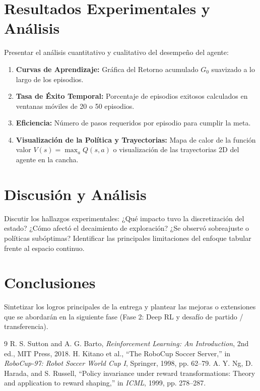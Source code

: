 \documentclass[11pt,a4paper]{article}
\begin{document}
\section{Resultados Experimentales y Análisis}
Presentar el análisis cuantitativo y cualitativo del desempeño del agente:

\begin{enumerate}
    \item \textbf{Curvas de Aprendizaje:} Gráfica del Retorno acumulado $G_0$ suavizado a lo largo de los episodios.
    \item \textbf{Tasa de Éxito Temporal:} Porcentaje de episodios exitosos calculados en ventanas móviles de 20 o 50 episodios.
    \item \textbf{Eficiencia:} Número de pasos requeridos por episodio para cumplir la meta.
    \item \textbf{Visualización de la Política y Trayectorias:} Mapa de calor de la función valor $V(s) = \max_a Q(s, a)$ o visualización de las trayectorias 2D del agente en la cancha.
\end{enumerate}


\section{Discusión y Análisis }
Discutir los hallazgos experimentales: ¿Qué impacto tuvo la discretización del estado? ¿Cómo afectó el decaimiento de exploración? ¿Se observó sobreajuste o políticas subóptimas? Identificar las principales limitaciones del enfoque tabular frente al espacio continuo.

\section{Conclusiones}
Sintetizar los logros principales de la entrega y plantear las mejoras o extensiones que se abordarán en la siguiente fase (Fase 2: Deep RL y desafío de partido / transferencia).

\begin{thebibliography}{9}
R. S. Sutton and A. G. Barto, \textit{Reinforcement Learning: An Introduction}, 2nd ed., MIT Press, 2018.
H. Kitano et al., ``The RoboCup Soccer Server,'' in \textit{RoboCup-97: Robot Soccer World Cup I}, Springer, 1998, pp. 62--79.
A. Y. Ng, D. Harada, and S. Russell, ``Policy invariance under reward transformations: Theory and application to reward shaping,'' in \textit{ICML}, 1999, pp. 278--287.
\end{thebibliography}
\end{document}
